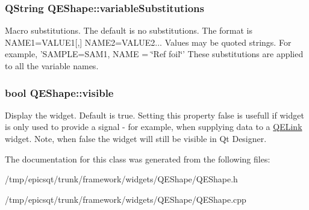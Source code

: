 \hypertarget{classQEShape_ac7187ecf5f9dd9fe1d1a0c90e88497ba}{
\subsubsection[{variableSubstitutions}]{\setlength{\rightskip}{0pt plus 5cm}QString QEShape::variableSubstitutions}}
\label{classQEShape_ac7187ecf5f9dd9fe1d1a0c90e88497ba}
Macro substitutions. The default is no substitutions. The format is NAME1=VALUE1\mbox{[},\mbox{]} NAME2=VALUE2... Values may be quoted strings. For example, 'SAMPLE=SAM1, NAME = \char`\"{}Ref foil\char`\"{}' These substitutions are applied to all the variable names. \hypertarget{classQEShape_a756bf7838f40027bd382d1ef28b10f1f}{
\subsubsection[{visible}]{\setlength{\rightskip}{0pt plus 5cm}bool QEShape::visible}}
\label{classQEShape_a756bf7838f40027bd382d1ef28b10f1f}
Display the widget. Default is true. Setting this property false is usefull if widget is only used to provide a signal -\/ for example, when supplying data to a \hyperlink{classQELink}{QELink} widget. Note, when false the widget will still be visible in Qt Designer. 

The documentation for this class was generated from the following files:\begin{DoxyCompactItemize}
\item 
/tmp/epicsqt/trunk/framework/widgets/QEShape/QEShape.h\item 
/tmp/epicsqt/trunk/framework/widgets/QEShape/QEShape.cpp\end{DoxyCompactItemize}
